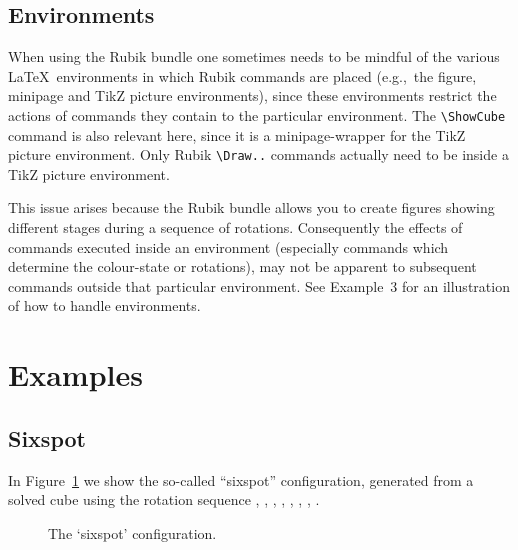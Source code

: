 \documentclass[a4paper]{article}
\begin{document}
\subsection{Environments}

When using the Rubik bundle one sometimes needs to be mindful of the various 
\LaTeX\ environments in which Rubik commands are placed (e.g.,~the figure, 
minipage and TikZ picture environments), since these environments restrict 
the actions of commands they contain to the particular environment. 
The \verb!\ShowCube! command is also relevant here, since it is a 
minipage-wrapper for the TikZ picture environment. Only Rubik  \verb!\Draw..! 
commands actually need to be inside a TikZ picture environment.

This issue arises because the Rubik bundle allows you to create figures 
showing different stages  during a sequence of rotations. Consequently 
the effects of  commands executed inside an environment (especially 
commands which determine the colour-state or rotations), may not  be 
apparent to subsequent commands outside that particular environment. 
See Example~3  for an illustration of how to handle environments.

\pagebreak

\section{Examples}

\subsection{Sixspot}

In Figure~\ref{fig:cubeincube} we show  the so-called ``sixspot'' configuration,
 generated from a solved cube using the rotation sequence 
, , , , , , , .

\begin{figure}[hbt]
\centering
\RubikCubeSolved
\RubikRotation{\sixspot}
\caption{\label{fig:cubeincube}The `sixspot' configuration.}
\end{figure}
\end{document}
